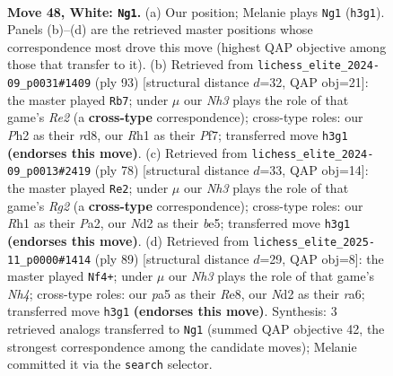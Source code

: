 \documentclass[11pt]{article}
\begin{document}
\clearpage

\begin{figure}[p]\centering
\begin{subfigure}{0.46\textwidth}\centering
\resizebox{\linewidth}{!}{%
\newchessgame
\chessboard[
  setfen={1r6/7k/1pb5/p1p1r3/8/2P2pPN/1K1N3P/7R w - - 2 48},
  showmover=false,
  pgfstyle=straightmove, color=movearrow, markmove={h3-g1}
]}
\caption{}
\end{subfigure}\hfill
\begin{subfigure}{0.46\textwidth}\centering
\resizebox{\linewidth}{!}{%
\newchessgame
\chessboard[
  setfen={3R4/k3rp2/n7/p2P1p1p/P6n/1PR2P2/3K4/8 b - - 1 47},
  showmover=false,
  pgfstyle=straightmove, color=movearrow, markmove={e7-b7}
]}
\caption{}
\end{subfigure}
\\[4pt]
\begin{subfigure}{0.46\textwidth}\centering
\resizebox{\linewidth}{!}{%
\newchessgame
\chessboard[
  setfen={8/pp3r1k/2p4p/3pb2N/8/3P4/PPK3R1/8 w - - 12 40},
  showmover=false,
  pgfstyle=straightmove, color=movearrow, markmove={g2-e2}
]}
\caption{}
\end{subfigure}\hfill
\begin{subfigure}{0.46\textwidth}\centering
\resizebox{\linewidth}{!}{%
\newchessgame
\chessboard[
  setfen={4r3/1r5k/R6p/1p3p1n/1B6/5P1K/1P1R2P1/8 b - - 2 45},
  showmover=false,
  pgfstyle=straightmove, color=movearrow, markmove={h5-f4}
]}
\caption{}
\end{subfigure}
\caption{\textbf{Move 48, White: \texttt{Ng1}.} (a) Our position; Melanie plays \texttt{Ng1} (\texttt{h3g1}). Panels (b)--(d) are the retrieved master positions whose correspondence most drove this move (highest QAP objective among those that transfer to it). (b) Retrieved from \texttt{lichess\_elite\_2024-09\_p0031\#1409} (ply 93) [structural distance $d$=32, QAP obj=21]: the master played \texttt{Rb7}; under $\mu$ our \emph{Nh3} plays the role of that game's \emph{Re2} (a \textbf{cross-type} correspondence); cross-type roles: our \emph{P}h2 as their \emph{r}d8, our \emph{R}h1 as their \emph{P}f7; transferred move \texttt{h3g1} \textbf{(endorses this move)}. (c) Retrieved from \texttt{lichess\_elite\_2024-09\_p0013\#2419} (ply 78) [structural distance $d$=33, QAP obj=14]: the master played \texttt{Re2}; under $\mu$ our \emph{Nh3} plays the role of that game's \emph{Rg2} (a \textbf{cross-type} correspondence); cross-type roles: our \emph{R}h1 as their \emph{P}a2, our \emph{N}d2 as their \emph{b}e5; transferred move \texttt{h3g1} \textbf{(endorses this move)}. (d) Retrieved from \texttt{lichess\_elite\_2025-11\_p0000\#1414} (ply 89) [structural distance $d$=29, QAP obj=8]: the master played \texttt{Nf4+}; under $\mu$ our \emph{Nh3} plays the role of that game's \emph{Nh4}; cross-type roles: our \emph{p}a5 as their \emph{R}e8, our \emph{N}d2 as their \emph{r}a6; transferred move \texttt{h3g1} \textbf{(endorses this move)}. Synthesis: 3 retrieved analogs transferred to \texttt{Ng1} (summed QAP objective 42, the strongest correspondence among the candidate moves); Melanie committed it via the \texttt{search} selector.}
\label{fig:thought-m94}
\end{figure}
\end{document}
